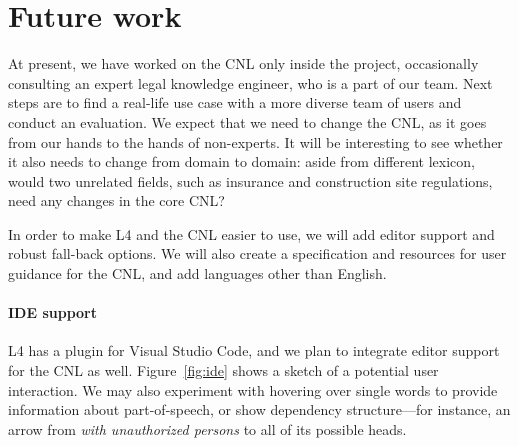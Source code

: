 \documentclass[11pt]{article}
\begin{document}
\section{Future work}
\label{sec:futurework}



At present, we have worked on the CNL only inside the project, occasionally consulting an expert legal knowledge engineer, who is a part of our team.
Next steps are to find a real-life use case with a more diverse team of users and conduct an evaluation. We expect that we need to change the CNL, as it goes from our hands to the hands of non-experts. It will be interesting to see whether it also needs to change from domain to domain: aside from different lexicon, would two unrelated fields, such as insurance and construction site regulations, need any changes in the core CNL? 


In order to make L4 and the CNL easier to use, we will add editor support and robust fall-back options. We will also create a specification and resources for user guidance for the CNL, and add languages other than English.

\paragraph{IDE support} 
L4 has a plugin for Visual Studio Code, and we plan to integrate editor support for the CNL as well. 
Figure~\ref{fig:ide} shows a sketch of a potential user interaction.
We may also experiment with hovering over single words to provide information about part-of-speech, or show dependency structure---for instance, an arrow from \textit{with unauthorized persons} to all of its possible heads.
\end{document}
